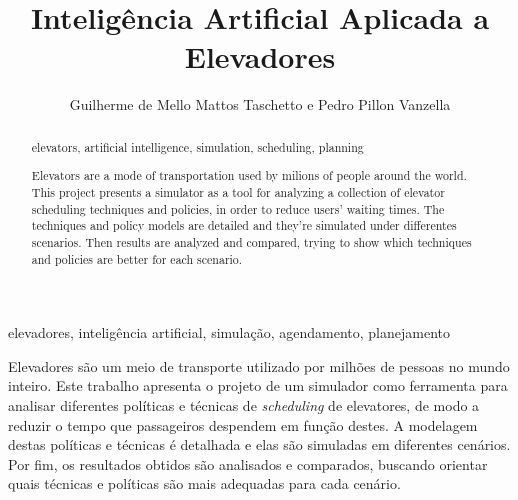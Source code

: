 \documentclass[portuguese,oneside]{tcc}
\author{Guilherme de Mello Mattos Taschetto e Pedro Pillon Vanzella}
\title{Inteligência Artificial Aplicada a Elevadores}
      {Artificial Intelligence Applied to Elevators}
\begin{document}
\begin{resumo}{elevadores, inteligência artificial, simulação, agendamento, planejamento}

Elevadores são um meio de transporte utilizado por milhões de pessoas no mundo
inteiro. Este trabalho apresenta o projeto de um simulador como ferramenta para
analisar diferentes políticas e técnicas de \textit{scheduling} de elevatores,
de modo a reduzir o tempo que passageiros despendem em função destes. A
modelagem destas políticas e técnicas é detalhada e elas são simuladas em
diferentes cenários. Por fim, os resultados obtidos são analisados e comparados,
buscando orientar quais técnicas e políticas são mais adequadas para cada
cenário.

\end{resumo}

\begin{abstract}{elevators, artificial intelligence, simulation, scheduling, planning}

Elevators are a mode of transportation used by milions of people around the
world. This project presents a simulator as a tool for analyzing a collection of
elevator scheduling techniques and policies, in order to reduce users' waiting
times. The techniques and policy models are detailed and they're simulated
under differentes scenarios. Then results are analyzed and compared, trying to
show which techniques and policies are better for each scenario.

\end{abstract}

\listoffigures
\listofalgorithms
\tableofcontents












\end{document}
